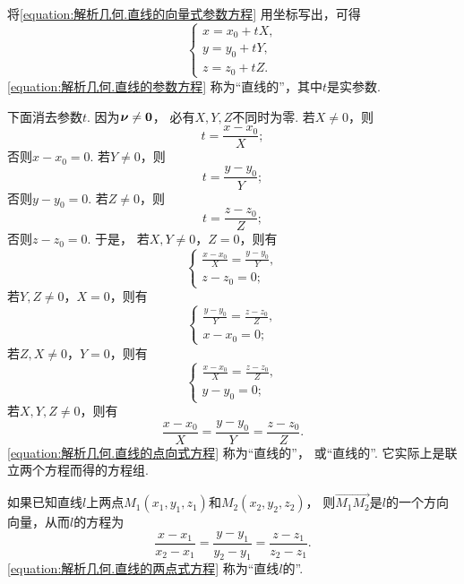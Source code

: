 将\cref{equation:解析几何.直线的向量式参数方程} 用坐标写出，可得
\begin{equation}\label{equation:解析几何.直线的参数方程}
	\left\{ \begin{array}{l}
		x = x_0 + t X, \\
		y = y_0 + t Y, \\
		z = z_0 + t Z.
	\end{array} \right.
\end{equation}
\cref{equation:解析几何.直线的参数方程} 称为“直线的”，其中\(t\)是实参数.

下面消去参数\(t\).
因为\(\boldsymbol{\nu}\neq\boldsymbol{0}\)，
必有\(X,Y,Z\)不同时为零.
若\(X\neq0\)，则\[
	t = \frac{x - x_0}{X};
\]
否则\(x - x_0 = 0\).
若\(Y\neq0\)，则\[
	t = \frac{y - y_0}{Y};
\]
否则\(y - y_0 = 0\).
若\(Z\neq0\)，则\[
	t = \frac{z - z_0}{Z};
\]
否则\(z - z_0 = 0\).
于是，
若\(X,Y\neq0\)，\(Z=0\)，则有
\begin{equation}
	\left\{ \begin{array}{l}
		\frac{x - x_0}{X}
		= \frac{y - y_0}{Y}, \\
		z - z_0 = 0;
	\end{array} \right.
\end{equation}
若\(Y,Z\neq0\)，\(X=0\)，则有
\begin{equation}
	\left\{ \begin{array}{l}
		\frac{y - y_0}{Y}
		= \frac{z - z_0}{Z}, \\
		x - x_0 = 0;
	\end{array} \right.
\end{equation}
若\(Z,X\neq0\)，\(Y=0\)，则有
\begin{equation}
	\left\{ \begin{array}{l}
		\frac{x - x_0}{X}
		= \frac{z - z_0}{Z}, \\
		y - y_0 = 0;
	\end{array} \right.
\end{equation}
若\(X,Y,Z\neq0\)，则有
\begin{equation}\label{equation:解析几何.直线的点向式方程}
	\frac{x - x_0}{X}
	= \frac{y - y_0}{Y}
	= \frac{z - z_0}{Z}.
\end{equation}
\cref{equation:解析几何.直线的点向式方程}
称为“直线的”，
或“直线的”.
它实际上是联立两个方程而得的方程组.

如果已知直线\(l\)上两点\(M_1(x_1,y_1,z_1)\)和\(M_2(x_2,y_2,z_2)\)，
则\(\vec{M_1 M_2}\)是\(l\)的一个方向向量，从而\(l\)的方程为
\begin{equation}\label{equation:解析几何.直线的两点式方程}
	\frac{x - x_1}{x_2 - x_1}
	= \frac{y - y_1}{y_2 - y_1}
	= \frac{z - z_1}{z_2 - z_1}.
\end{equation}
\cref{equation:解析几何.直线的两点式方程}
称为“直线\(l\)的”.


